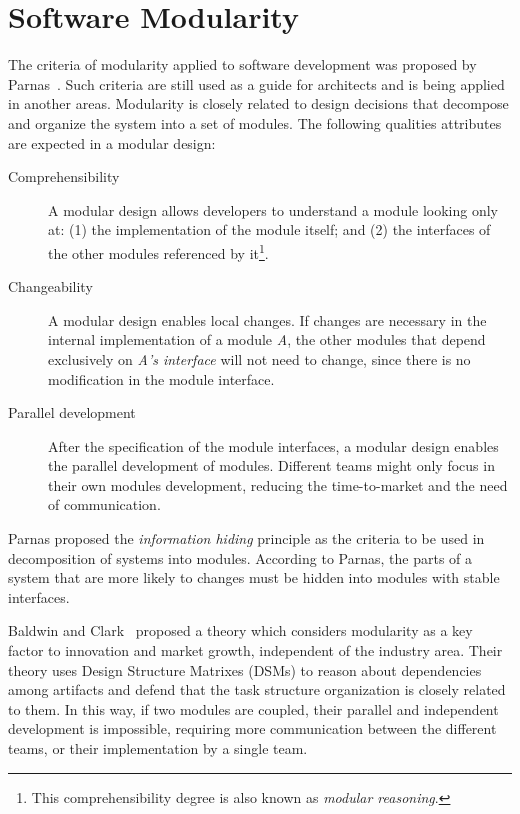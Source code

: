 \section{Software Modularity}\label{sec:software-modularity}

The criteria of modularity applied to software development was proposed
by Parnas~\cite{parnas-cacm-1972}. Such
criteria are still used as a guide for architects and is being applied
in another areas. Modularity is closely related to design decisions
that decompose and organize the system into a set of modules. The
following qualities attributes are expected in a modular design:

\begin{description}

\item[Comprehensibility] A modular design allows developers to
understand a module looking only at: (1) the implementation of the
module itself; and (2) the interfaces of the other modules
referenced by it\footnote{This comprehensibility degree is also
known as \emph{modular reasoning}.}.

\item[Changeability] A modular design enables local
changes. If changes are necessary in the internal implementation of
a module \emph{A}, the other modules that depend exclusively on
\emph{A's interface} will not need to change, since there is no
modification in the module interface.

\item[Parallel development] After the specification of the module
interfaces, a modular design enables the parallel development of
modules. Different teams might only focus in their own modules
development, reducing the time-to-market and the need of
communication.

\end{description}

Parnas proposed the \emph{information hiding} principle as the
criteria to be used in decomposition of systems into modules.
According to Parnas, the parts of a system that are more likely to
changes must be hidden into modules with stable interfaces.

Baldwin and Clark~\cite{clark-design-rules-book} proposed a theory which considers
modularity as a key factor to innovation and market growth, independent of the industry
area. Their theory uses Design Structure Matrixes (DSMs) to reason about dependencies
among artifacts and defend that the task structure organization is closely related to
them. In this way, if two modules are coupled, their parallel and independent development
is impossible, requiring more communication between the different teams, or their
implementation by a single team.


